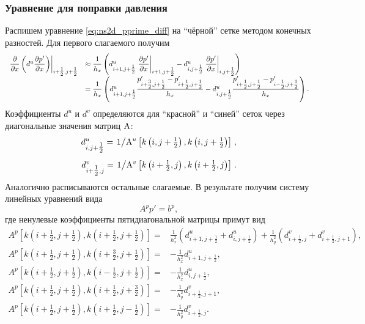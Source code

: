 \subsubsection{Уравнение для поправки давления}
Распишем уравнение \eqref{eq:ns2d_pprime_diff}
на ``чёрной'' сетке методом конечных разностей.
Для первого слагаемого получим
\begin{equation}
\label{eq:ns2d_d2pdx2}
\begin{array}{ll}
\left.\dfrac{\partial }{\partial x}\left(d^u \dfrac{\partial p'}{\partial x}\right) \right|_{i+\tfrac12, j+\tfrac12}
    &\approx
        \dfrac{1}{h_x}\left(
            d^u_{i+1, j+\tfrac12} \left. \dfrac{\partial p'}{\partial x} \right|_{i+1, j+\tfrac12} -
            d^u_{i, j+\tfrac12} \left. \dfrac{\partial p'}{\partial x} \right|_{i, j+\tfrac12}
        \right) \\[10pt]

    &=
        \dfrac{1}{h_x}\left(
            d^u_{i+1, j+\tfrac12} \dfrac{p'_{i+\tfrac32,j+\tfrac12} - p'_{i+\tfrac12,j+\tfrac12}}{h_x} - 
            d^u_{i, j+\tfrac12}  \dfrac{p'_{i+\tfrac12,j+\tfrac12} - p'_{i-\tfrac12,j+\tfrac12}}{h_x}
        \right).
\end{array}
\end{equation}
Коэффициенты $d^u$ и $d^v$ определяются для ``красной'' и ``синей'' сеток через диагональные значения матриц ${\rm A}$:
\begin{align}
\label{eq:ns2d_du_fdm}
d^u_{i,j+\tfrac12} =    \left.1\middle/{\rm A}^u\left[
        k\left(i,j+\tfrac12\right),
        k\left(i,j+\tfrac12\right)\right]\right., \\[5pt]
\label{eq:ns2d_dv_fdm}
d^v_{i+\tfrac12,j} =    \left.1\middle/{\rm A}^v\left[
        k\left(i+\tfrac12,j\right),
        k\left(i+\tfrac12,j\right)\right]\right..
\end{align}
Аналогично расписываются остальные слагаемые. В результате получим систему линейных уравнений вида
\begin{equation}
    \label{eq:ns2d_pprime_slae}
    A^p p' = b^p,
\end{equation}
где ненулевые коэффициенты пятидиагональной матрицы примут вид
\begin{align}
    \label{eq:ns2d_ap}
    A^p[k(i+\tfrac12, j+\tfrac12), k(i+\tfrac12, j+\tfrac12)] =&
        \frac{1}{h_x^2}\left( d^u_{i+1,j+\tfrac12} + d^u_{i,j+\tfrac12} \right)
        +\frac{1}{h_y^2}\left( d^v_{i+\tfrac12,j} + d^v_{i+\tfrac12,j+1} \right), \\[10pt]
    \nonumber
    A^p[k(i+\tfrac12, j+\tfrac12), k(i+\tfrac32, j+\tfrac12)] =&
        -\frac{1}{h_x^2}d^u_{i+1,j+\tfrac12}, \\[10pt]
    \nonumber
    A^p[k(i+\tfrac12, j+\tfrac12), k(i-\tfrac12, j+\tfrac12)] =&
        -\frac{1}{h_x^2}d^u_{i,j+\tfrac12}, \\[10pt]
    \nonumber
    A^p[k(i+\tfrac12, j+\tfrac12), k(i+\tfrac12, j+\tfrac32)] =&
        -\frac{1}{h_y^2}d^v_{i+\tfrac12,j+1}, \\[10pt]
    \nonumber
    A^p[k(i+\tfrac12, j+\tfrac12), k(i+\tfrac12, j-\tfrac12)] =&
        -\frac{1}{h_y^2}d^v_{i+\tfrac12,j}.\\[10pt]
\end{align}
